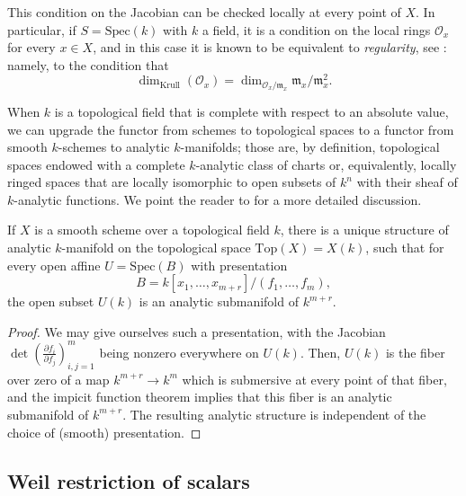 This condition on the Jacobian can be checked locally at every point of $X$. In particular, if $S=\text{Spec}(k)$ with $k$ a field, it is a condition on the local rings $\mathcal O_x$ for every $x\in X$, and in this case it is known to be equivalent to \emph{regularity}, see \cite[\href{https://stacks.math.columbia.edu/tag/00TV}{Tag 00TV}]{stacks-project}: namely, to the condition that 
\begin{equation}
\label{equation-regularlocalring}
\dim_{\text{Krull}}(\mathcal O_x) = \dim_{\mathcal O_x/\mathfrak m_x} \mathfrak m_x/\mathfrak m_x^2.
\end{equation}


When $k$ is a topological field that is complete with respect to an absolute value, we can upgrade the functor from schemes to topological spaces to a functor from smooth $k$-schemes to analytic $k$-manifolds; those are, by definition, topological spaces endowed with a complete $k$-analytic class of charts or, equivalently, locally ringed spaces that are locally isomorphic to open subsets of $k^n$ with their sheaf of $k$-analytic functions. We point the reader to \cite{Serre-Lie} for a more detailed discussion.


\begin{proposition}
\label{proposition-smooth-schemes-to-manifolds}
If $X$ is a smooth scheme over a topological field $k$, there is a unique structure of analytic $k$-manifold on the topological space $\text{Top}(X)=X(k)$, such that for every open affine $U=\text{Spec}(B)$ with presentation 
$$B=k[x_1, \dots, x_{m+r}]/(f_1, \dots, f_m),$$ the open subset $U(k)$ is an analytic submanifold of $k^{m+r}$.
\end{proposition}

\begin{proof}
 We may give ourselves such a presentation, with the Jacobian $\det \left( \frac{\partial f_i}{\partial f_j} \right)_{i, j=1}^m$ being nonzero everywhere on $U(k)$. Then, $U(k)$ is the fiber over zero of a map $k^{m+r}\to k^m$ which is submersive at every point of that fiber, and the impicit function theorem implies that this fiber is an analytic submanifold of $k^{m+r}$. The resulting analytic structure is independent of the choice of (smooth) presentation.
\end{proof}


\subsection{Weil restriction of scalars}
\label{subsection-Weil-restriction}

